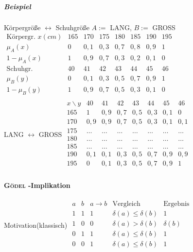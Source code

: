 \documentclass[a4paper]{scrartcl}
\begin{document}
\subparagraph{Beispiel} Körpergröße $\leftrightarrow$ Schuhgröße $A:=$ LANG, $B:=$ GROSS\\
$\begin{array}{c|c|c|c|c|c|c|c}
\text{Körpergr. } x (cm) & 165 & 170 & 175 & 180 & 185 & 190 & 195\\ \hline
\mu_A(x) & 0 & 0,1 & 0,3 & 0,7 & 0,8 & 0,9 & 1\\
1 - \mu_A(x) & 1 & 0,9 & 0,7 & 0,3 & 0,2 & 0,1 & 0\\ \hline
\text{Schuhgr. } & 40 & 41 & 42 & 43 & 44 & 45 & 46\\ \hline
\mu_B(y) & 0 & 0,1 & 0,3 & 0,5 & 0,7 & 0,9 & 1 \\
1 - \mu_B(y) & 1 & 0,9 & 0,7 & 0,5 & 0,3 & 0,1 & 0\\

\end{array}$\\

LANG $\leftrightarrow$ GROSS
$\begin{array}{c|c|c|c|c|c|c|c}
x \backslash y & 40 & 41 & 42 & 43 & 44 & 45 & 46\\ \hline
165 & 1 & 0,9 & 0,7 & 0,5 & 0,3 & 0,1 & 0\\
170 & 0,9 & 0,9 & 0,7 & 0,5 & 0,3 & 0,1 & 0,1 \\
175 & \dots & \dots & \dots & \dots & \dots & \dots & \dots \\
180 & \dots & \dots & \dots & \dots & \dots & \dots & \dots \\
185 & \dots & \dots & \dots & \dots & \dots & \dots & \dots \\
190 & 0,1 & 0,1 & 0,3 & 0,5 & 0,7 & 0,9 & 0,9\\
195 & 0 & 0,1 & 0,3 & 0,5 & 0,7 & 0,9 & 1\\

\end{array}$

\paragraph{\textsc{Gödel} -Implikation} Motivation(klassisch)
$\begin{array}{c|c|c|c|c}
a & b & a \rightarrow b & \text{Vergleich} & \text{Ergebnis}\\ \hline
1 & 1 & 1 & \delta (a) \leq \delta (b) & 1\\
1 & 0 & 0 & \delta (a) > \delta (b) & \delta (b)\\
0 & 1 & 1 & \delta (a) \leq \delta (b) & 1 \\
0 & 0 & 1 & \delta (a) \leq \delta (b) & 1 \\
\end{array}$
\end{document}
